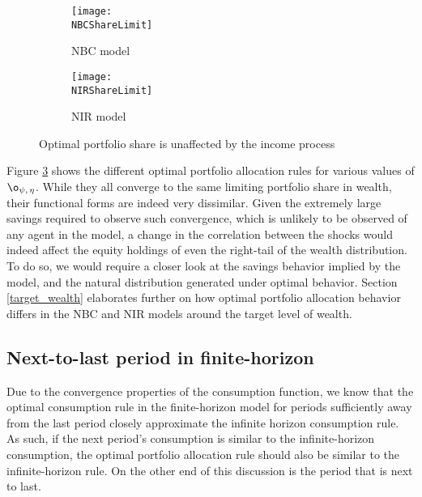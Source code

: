 \begin{figure}[h]
    \centering
    \begin{subfigure}{0.49\textwidth}
        \centering
        \texttt{[image: \\NBCShareLimit]}
        \caption{NBC model}
        \label{subfig:shareLimit_NBC}
    \end{subfigure}
    \begin{subfigure}{0.49\textwidth}
        \centering
        \texttt{[image: \\NIRShareLimit]}
        \caption{NIR model}
        \label{subfig:shareLimit_NIR}
    \end{subfigure}
    \caption{Optimal portfolio share is unaffected by the income process}
    \label{fig:shareLimit}
\end{figure}

Figure \ref{fig:shareLimit} shows the different optimal portfolio allocation rules for various values of $\o_{\psi,\,\eta}$. While they all converge to the same limiting portfolio share in wealth, their functional forms are indeed very dissimilar. Given the extremely large savings required to observe such convergence, which is unlikely to be observed of any agent in the model, a change in the correlation between the shocks would indeed affect the equity holdings of even the right-tail of the wealth distribution. To do so, we would require a closer look at the savings behavior implied by the model, and the natural distribution generated under optimal behavior. Section \ref{target_wealth} elaborates further on how optimal portfolio allocation behavior differs in the NBC and NIR models around the target level of wealth.

\subsection{Next-to-last period in finite-horizon}\label{finite_horizon}

Due to the convergence properties of the consumption function, we know that the optimal consumption rule in the finite-horizon model for periods sufficiently away from the last period closely approximate the infinite horizon consumption rule. As such, if the next period's consumption is similar to the infinite-horizon consumption, the optimal portfolio allocation rule should also be similar to the infinite-horizon rule. On the other end of this discussion is the period that is next to last.

